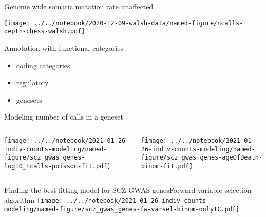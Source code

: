 \documentclass[usenames,dvipsnames]{beamer}
\begin{document}
\begin{frame}{Genome wide somatic mutation rate unaffected}
\begin{center}
\texttt{[image: ../../notebook/2020-12-09-walsh-data/named-figure/ncalls-depth-chess-walsh.pdf]}
\end{center}
\end{frame}

\begin{frame}{Annotation with functional categories}
\begin{itemize}
\item coding categories
\item regulatory
\item genesets
\end{itemize}
\end{frame}

\begin{frame}{Modeling number of calls in a geneset}
\begin{columns}[t]
\begin{column}{0.5\textwidth}

\texttt{[image: ../../notebook/2021-01-26-indiv-counts-modeling/named-figure/scz\_gwas\_genes-log10\_ncalls-poisson-fit.pdf]}
\end{column}

\begin{column}{0.5\textwidth}

\texttt{[image: ../../notebook/2021-01-26-indiv-counts-modeling/named-figure/scz\_gwas\_genes-ageOfDeath-binom-fit.pdf]}
\end{column}
\end{columns}
\begin{center}
\end{center}
\end{frame}

\begin{frame}{Finding the best fitting model for SCZ GWAS genes}{Forward variable selection algorithm}
\texttt{[image: ../../notebook/2021-01-26-indiv-counts-modeling/named-figure/scz\_gwas\_genes-fw-varsel-binom-onlyIC.pdf]}
\end{frame}
\end{document}
